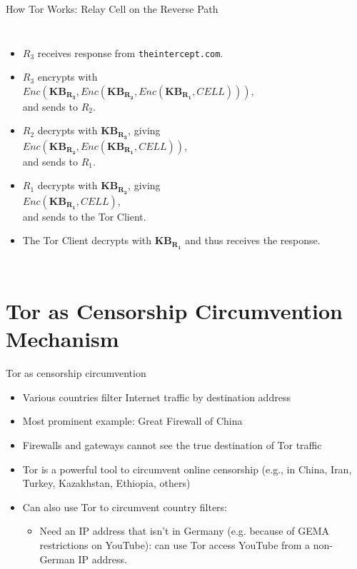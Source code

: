 \documentclass[9pt,a4paper,handout]{beamer}
\begin{document}
\begin{frame}{How Tor Works: Relay Cell on the Reverse Path}
\begin{columns}
    \begin{itemize}
      \item $R_3$ receives response from \texttt{theintercept.com}.
      \item<2-> $R_3$ encrypts with \\
        $Enc(\mathbf{KB_{R_3}}, Enc(\mathbf{KB_{R_2}}, Enc(\mathbf{KB_{R_1}}, CELL)))$, \\
        and sends to $R_2$.
      \item<5-> $R_2$ decrypts with $\mathbf{KB_{R_3}}$, giving \\
        $Enc(\mathbf{KB_{R_2}}, Enc(\mathbf{KB_{R_1}}, CELL))$, \\
        and sends to $R_1$.
      \item<6-> $R_1$ decrypts with $\mathbf{KB_{R_2}}$, giving \\
        $Enc(\mathbf{KB_{R_1}}, CELL)$, \\
        and sends to the Tor Client.
      \item<7-> The Tor Client decrypts with $\mathbf{KB_{R_1}}$ and thus receives the response.
    \end{itemize}
  \end{columns}
\end{frame}


\section{Tor as Censorship Circumvention Mechanism}

\begin{frame}{Tor as censorship circumvention}
  \begin{itemize}
    \item Various countries filter Internet traffic by destination address
    \item Most prominent example: Great Firewall of China
    \item<2-> Firewalls and gateways cannot see the true destination of Tor traffic
    \item<2-> Tor is a powerful tool to circumvent online censorship (e.g., in China,
      Iran, Turkey, Kazakhstan, Ethiopia, others)
    \item<3-> Can also use Tor to circumvent country filters:
      \begin{itemize}
      \item Need an IP address that isn't in Germany (e.g. because of GEMA
        restrictions on YouTube): can use Tor access YouTube from a non-German
        IP address.
      \end{itemize}
  \end{itemize}
\end{frame}
\end{document}
